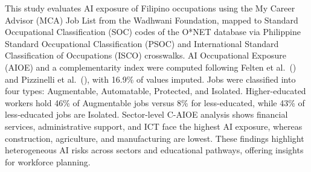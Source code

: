 This study evaluates AI exposure of Filipino occupations using the My Career Advisor (MCA) Job List from the Wadhwani Foundation, 
mapped to Standard Occupational Classification (SOC) codes of the O*NET database via Philippine Standard Occupational Classification (PSOC) and International Standard Classification of Occupations (ISCO) crosswalks. 
AI Occupational Exposure (AIOE) and a complementarity index were computed following Felten et al.\ (\citeyear{felten2021}) and Pizzinelli et al.\ (\citeyear{Pizzinelli2023Labor}), with 16.9\% of values imputed. 
Jobs were classified into four types: Augmentable, Automatable, Protected, and Isolated. 
Higher-educated workers hold 46\% of Augmentable jobs versus 8\% for less-educated, while 43\% of less-educated jobs are Isolated. 
Sector-level C-AIOE analysis shows financial services, administrative support, and ICT face the highest AI exposure, whereas construction, agriculture, and manufacturing are lowest. 
These findings highlight heterogeneous AI risks across sectors and educational pathways, offering insights for workforce planning.
